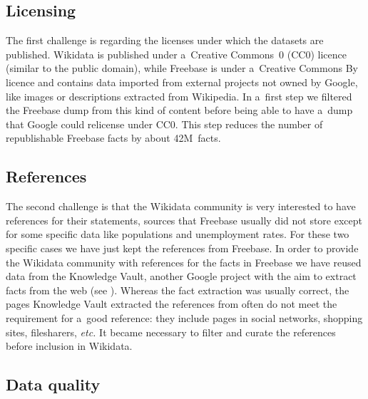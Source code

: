 \documentclass{sig-alternate}
\begin{document}
\subsection{Licensing}
\label{sec-licensing}

The first challenge is regarding the licenses under which the datasets are published.
Wikidata is published under a~Creative Commons~0 (CC0) licence (similar to the public domain),
while Freebase is under a~Creative Commons By licence and contains data
imported from external projects not owned by Google,
like images or descriptions extracted from Wikipedia.
In a~first step we filtered the Freebase dump from this kind of content
before being able to have a~dump that Google could relicense under CC0.
This step reduces the number of republishable Freebase facts by about 42M~facts.

\subsection{References}

The second challenge is that the Wikidata community is very interested to have references
for their statements, sources that Freebase usually did not store except for
some specific data like populations and unemployment rates.
For these two specific cases we have just kept the references from Freebase.
In order to provide the Wikidata community with references for the facts in Freebase
we have reused data from the Knowledge Vault, another Google project with the aim
to extract facts from the web (see \cite{dong2014knowledge}).
Whereas the fact extraction was usually correct, the pages Knowledge Vault extracted
the references from often do not meet the requirement for a~good reference:
they include pages in social networks, shopping sites, filesharers, \emph{etc.}
It became necessary to filter and curate the references before inclusion in Wikidata.

\subsection{Data quality}
\end{document}
